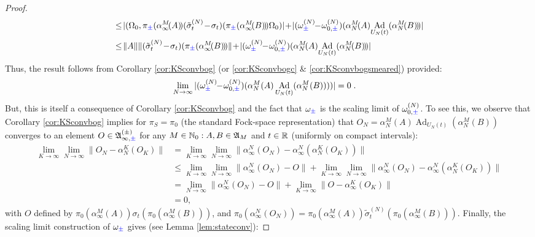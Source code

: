 \documentclass[a4paper, 11pt]{article}
\newcommand{\fA}{\mathfrak{A}}\newcommand{\cA}{\mathcal{A}}\newcommand{\dA}{\mathds{A}}\newcommand{\sA}{\mathscr{A}}
\DeclareMathOperator{\Ad}{Ad}
\DeclareMathOperator{\1}{\mathds{1}}
\begin{document}
\begin{proof}
\begin{align*}
&\!\leq\!|(\Omega_{0},\pi_{{\color{blue}\pm}}(\alpha^{M}_{\infty}\!(A)\!)(\tilde{\sigma}^{(N)}_{t}\!-\!\sigma_{t})(\pi_{{\color{blue}\pm}}(\alpha^{M}_{\infty}\!(B)\!)\!)\Omega_{0})|\!+\!|(\omega^{(N)}_{{\color{blue}\pm}}\!\!-\!\omega^{(N)}_{0,{\color{blue}\pm}})(\alpha^{M}_{N}\!(A)\!\Ad_{U_{N}(t)}(\alpha^{M}_{N}\!(B)\!)\!)| \\
&\!\leq\!\|A\|\|(\tilde{\sigma}^{(N)}_{t}\!-\!\sigma_{t})(\pi_{{\color{blue}\pm}}(\alpha^{M}_{\infty}\!(B)\!)\!)\|\!+\!|(\omega^{(N)}_{{\color{blue}\pm}}\!\!-\!\omega^{(N)}_{0,{\color{blue}\pm}})(\alpha^{M}_{N}\!(A)\!\Ad_{U_{N}(t)}(\alpha^{M}_{N}\!(B)\!)\!)|
\end{align*}
Thus, the result follows from Corollary \ref{cor:KSconvbog} (or \ref{cor:KSconvbogc} \& \ref{cor:KSconvbogsmeared}) provided:
\begin{align*}
\lim_{N\rightarrow\infty}|(\omega^{(N)}_{{\color{blue}\pm}}\!\!-\!\omega^{(N)}_{0,{\color{blue}\pm}})(\alpha^{M}_{N}(A)\Ad_{U_{N}(t)}(\alpha^{M}_{N}(B))))| & = 0\;.
\end{align*}
But, this is itself a consequence of Corollary \ref{cor:KSconvbog} and the fact that $\omega_{{\color{blue}\pm}}$ is the scaling limit of $\omega^{(N)}_{0,{\color{blue}\pm}}$. To see this, we observe that Corollary \ref{cor:KSconvbog} implies for $\pi_{S} = \pi_{0}$ (the standard Fock-space representation) that $O_{N} = \alpha^{M}_{N}(A)\Ad_{U_{N}(t)}(\alpha^{M}_{N}(B))$ converges to an element $O\in\fA^{(\pm)}_{\infty,{\color{blue}\pm}}$ for any $M\in\N_{0}: A,B\in\fA_{M}$ and $t\in\mathbb{R}$ (uniformly on compact intervals):
\begin{align*}
\lim_{K\rightarrow\infty}\lim_{N\rightarrow\infty}\!\!\|O_{N}\!-\!\alpha^{K}_{N}(O_{K})\| &\!=\!\lim_{K\rightarrow\infty}\lim_{N\rightarrow\infty}\!\!\|\alpha^{N}_{\infty}(O_{N})\!-\!\alpha^{N}_{\infty}(\alpha^{K}_{N}(O_{K})\!)\| \\
& \!\leq\!\lim_{K\rightarrow\infty}\lim_{N\rightarrow\infty}\!\!\|\alpha^{N}_{\infty}\!(O_{N})\!-\!O\|\!+\!\lim_{K\rightarrow\infty}\lim_{N\rightarrow\infty}\!\!\|\alpha^{N}_{\infty}\!(O_{N})\!-\!\alpha^{N}_{\infty}\!(\alpha^{K}_{N}\!(O_{K})\!)\| \\
& = \lim_{N\rightarrow\infty}\|\alpha^{N}_{\infty}(O_{N})-O\| + \lim_{K\rightarrow\infty}\|O-\alpha^{K}_{\infty}(O_{K})\| \\
& = 0,
\end{align*}
with $O$ defined by $\pi_{0}(\alpha^{M}_{\infty}(A)\!)\sigma_{t}(\pi_{0}(\alpha^{M}_{\infty}(B)\!)\!)$, and $\pi_{0}(\alpha^{N}_{\infty}(O_{N})\!)\!=\!\pi_{0}(\alpha^{M}_{\infty}(A)\!)\tilde{\sigma}^{(N)}_{t}\!(\pi_{0}(\alpha^{M}_{\infty}(B)\!)\!)$. Finally, the scaling limit construction of $\omega_{{\color{blue}\pm}}$ gives (see Lemma \ref{lem:stateconv}):

\end{proof}
\end{document}
